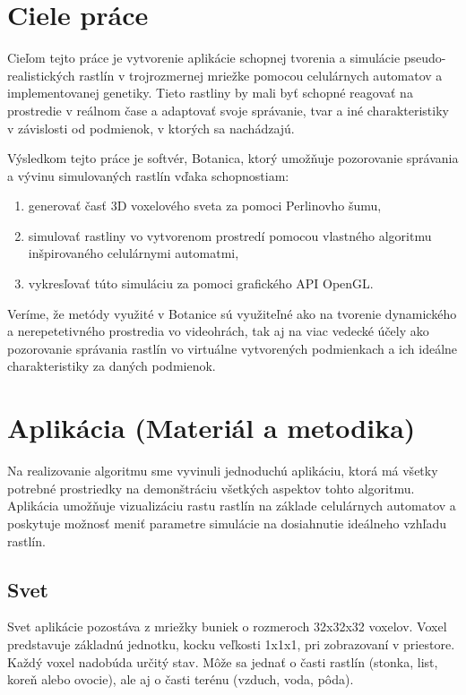 \documentclass[12pt]{article}
\begin{document}
\section{Ciele práce}

Cieľom tejto práce je vytvorenie aplikácie schopnej tvorenia a simulácie
pseudo-rea\-listických rastlín v trojrozmernej mriežke pomocou celulárnych
automatov a implementovanej genetiky.
Tieto rastliny by mali byť schopné reagovať na prostredie v reálnom čase
a adaptovať svoje správanie, tvar a iné charakteristiky v závislosti
od podmienok, v ktorých sa nachádzajú.

Výsledkom tejto práce je softvér, Botanica, ktorý umožňuje pozorovanie
správania a vývinu simulovaných rastlín vďaka schopnostiam:

\begin{enumerate}
	\item generovať časť 3D voxelového sveta za pomoci Perlinovho šumu,
	\item simulovať rastliny vo vytvorenom prostredí pomocou vlastného
	      algoritmu inšpirovaného celulárnymi automatmi,
	\item vykresľovať túto simuláciu za pomoci grafického API OpenGL.
\end{enumerate}

Veríme, že metódy využité v Botanice sú využiteľné ako na tvorenie dynamického
a nerepetetivného prostredia vo videohrách, tak aj na viac vedecké účely
ako pozorovanie správania rastlín vo virtuálne vytvorených podmienkach
a ich ideálne charakteristiky za daných podmienok.


\section{Aplikácia (Materiál a metodika)}

Na realizovanie algoritmu sme vyvinuli jednoduchú aplikáciu, ktorá má
všetky potrebné prostriedky na demonštráciu všetkých aspektov tohto algoritmu.
Aplikácia umožňuje vizualizáciu rastu rastlín na základe celulárnych automatov
a poskytuje možnosť meniť parametre simulácie na dosiahnutie ideálneho vzhľadu
rastlín.

\subsection{Svet} \label{subsec:svet}

Svet aplikácie pozostáva z mriežky buniek o rozmeroch 32x32x32 voxelov.
Voxel predstavuje základnú jednotku, kocku veľkosti 1x1x1, pri zobrazovaní v priestore.
Každý voxel nadobúda určitý stav. Môže sa jednať o časti rastlín (stonka, list,
koreň alebo ovocie), ale aj o časti terénu (vzduch, voda, pôda).
\end{document}
